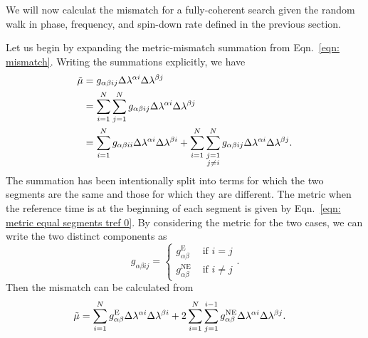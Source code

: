 We will now calculat the mismatch for a fully-coherent search given the
random walk in phase, frequency, and spin-down rate defined in the previous
section.

Let us begin by expanding the metric-mismatch summation from Eqn.~\eqref{eqn:
mismatch}.  Writing the summations explicitly, we have
\begin{align}
\tilde{\mu} & = g_{\alpha\beta i j}\Delta\lambda^{\alpha i}\Delta\lambda^{\beta j}  \\
&=\sum_{i=1}^{N}\sum_{j=1}^{N}g_{\alpha\beta i j}\Delta\lambda^{\alpha i}\Delta\lambda^{\beta j}  \\
&= \sum_{i=1}^{N}g_{\alpha\beta i i}\Delta\lambda^{\alpha i}\Delta\lambda^{\beta i}
+ \sum_{i=1}^{N} \sum_{\substack{j=1\\ j \ne i}}^{N} g_{\alpha \beta ij}\Delta\lambda^{\alpha i}\Delta\lambda^{\beta j}.
\end{align}
The summation has been intentionally split into terms for which the two
segments are the same and those for which they are different. The metric when
the reference time is at the beginning of each segment is given by
Eqn.~\eqref{eqn: metric equal segments tref 0}. By considering the metric for
the two cases, we can write the two distinct components as
\begin{equation}
g_{\alpha\beta ij} = \left\{
\begin{array}{cc}
g_{\alpha\beta}^{\mathrm{E}} & \textrm{ if } i =j \\
g_{\alpha\beta}^{\mathrm{NE}} & \textrm{ if } i  \ne j
\end{array}\right.  .
\end{equation}
Then the mismatch can be calculated from
\begin{align}
\tilde{\mu} &= \sum_{i=1}^{N}g_{\alpha\beta}^{\mathrm{E}}\Delta\lambda^{\alpha i}\Delta\lambda^{\beta i}
+ 2\sum_{i=1}^{N} \sum_{j=1}^{i-1} g_{\alpha \beta}^{\mathrm{NE}}\Delta\lambda^{\alpha i}\Delta\lambda^{\beta j} .
\label{eqn: mismatch sep}
\end{align}


